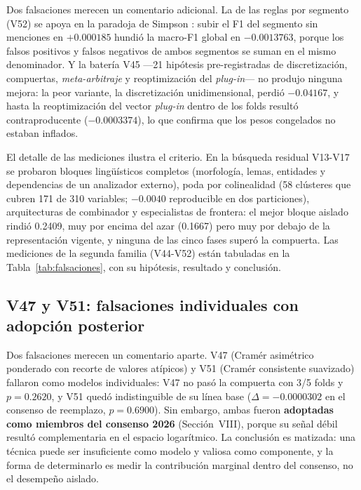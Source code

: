 \documentclass[journal]{IEEEtai}
\begin{document}
Dos falsaciones merecen un comentario adicional. La de las reglas por segmento (V52) se apoya en la paradoja de Simpson \cite{simpson1951}: subir el F1 del segmento sin menciones en $+0.000185$ hundi\'o la macro-F1 global en $-0.0013763$, porque los falsos positivos y falsos negativos de ambos segmentos se suman en el mismo denominador. Y la bater\'ia V45 ---21 hip\'otesis pre-registradas de discretizaci\'on, compuertas, \textit{meta-arbitraje} y reoptimizaci\'on del \textit{plug-in}--- no produjo ninguna mejora: la peor variante, la discretizaci\'on unidimensional, perdi\'o $-0.04167$, y hasta la reoptimizaci\'on del vector \textit{plug-in} dentro de los folds result\'o contraproducente ($-0.0003374$), lo que confirma que los pesos congelados no estaban inflados.

El detalle de las mediciones ilustra el criterio. En la b\'usqueda residual V13-V17 se probaron
bloques ling\"u\'isticos completos (morfolog\'ia, lemas, entidades y dependencias de un
analizador externo), poda por colinealidad (58 cl\'usteres que cubren 171 de 310 variables;
$-0.0040$ reproducible en dos particiones), arquitecturas de combinador y especialistas de
frontera: el mejor bloque aislado rindi\'o 0.2409, muy por encima del azar (0.1667) pero muy por
debajo de la representaci\'on vigente, y ninguna de las cinco fases super\'o la compuerta. Las mediciones de la segunda familia (V44-V52) est\'an tabuladas en la Tabla~\ref{tab:falsaciones}, con su hip\'otesis, resultado y conclusi\'on.

\subsection{V47 y V51: falsaciones individuales con adopci\'on posterior}

Dos falsaciones merecen un comentario aparte. V47 (Cram\'er asim\'etrico ponderado con recorte de valores at\'ipicos) y V51 (Cram\'er consistente suavizado) fallaron como modelos individuales: V47 no pas\'o la compuerta con 3/5 folds y $p = 0.2620$, y V51 qued\'o indistinguible de su l\'inea base ($\Delta = -0.0000302$ en el consenso de reemplazo, $p = 0.6900$). Sin embargo, ambas fueron \textbf{adoptadas como miembros del consenso 2026} (Secci\'on~VIII), porque su se\~nal d\'ebil result\'o complementaria en el espacio logar\'itmico. La conclusi\'on es matizada: una t\'ecnica puede ser insuficiente como modelo y valiosa como componente, y la forma de determinarlo es medir la contribuci\'on marginal dentro del consenso, no el desempe\~no aislado.
\end{document}
